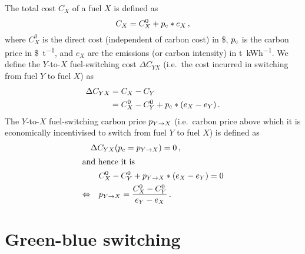 \documentclass[%
 draft,
 aapm,
 mph,%
 amsmath,amssymb,
 reprint,%
]{revtex4-2}
\begin{document}
The total cost $C_X$ of a fuel $X$ is defined as
\begin{equation}
    C_X = C^0_X + p_{\mathrm{c}} * e_X \,,
\end{equation}
where $C^0_X$ is the direct cost (independent of carbon cost) in \si{\$}, $p_{\mathrm{c}}$ is the carbon price in \si{\$\per\tonne_{}}, and $e_X$ are the emissions (or carbon intensity) in \si{\tonne_{}\per\kWh}. We define the $Y$-to-$X$ fuel-switching cost $\Delta C_{YX}$ (i.e.~the cost incurred in switching from fuel $Y$ to fuel $X$) as
\begin{align}
    \Delta C_{YX} &= C_X - C_Y \\
                  &= C^0_X - C^0_Y + p_{\mathrm{c}} * (e_X - e_Y) \,.
\end{align}
The $Y$-to-$X$ fuel-switching carbon price $p_{Y\rightarrow X}$ (i.e.~carbon price above which it is economically incentivised to switch from fuel $Y$ to fuel $X$) is defined as
\begin{align}
                    & \Delta C_{YX} (p_{\mathrm{c}} = p_{Y\rightarrow X}) = 0 \,, \\
\intertext{and hence it is}
                    &~~~ C^0_X - C^0_Y + p_{Y\rightarrow X} * (e_X - e_Y) = 0 \\
  \Leftrightarrow   &~~~ p_{Y\rightarrow X} = \frac{C^0_X - C^0_Y}{e_Y - e_X} \,.
\end{align}

\section{Green-blue switching}
\end{document}

